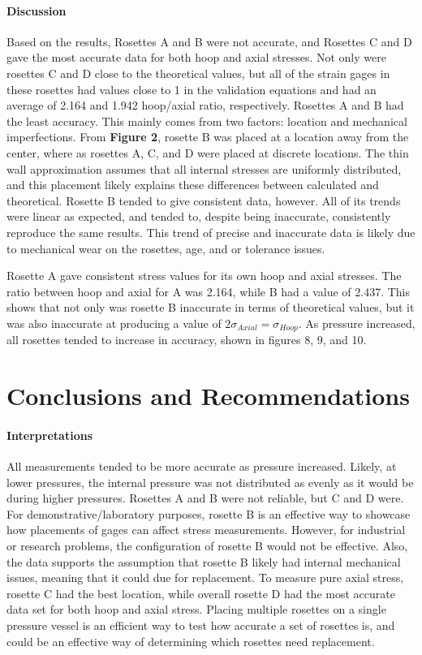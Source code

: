 \documentclass[12pt]{article}
\begin{document}
\paragraph{Discussion}
Based on the results, Rosettes A and B were not accurate, and Rosettes C and D gave the most accurate data for both hoop and axial stresses. Not only were rosettes C and D close to the theoretical values, but all of the strain gages in these rosettes had values close to 1 in the validation equations and had an average of 2.164 and 1.942 hoop/axial ratio, respectively. Rosettes A and B had the least accuracy. This mainly comes from two factors: location and mechanical imperfections. From \textbf{Figure 2}, rosette B was placed at a location away from the center, where as rosettes A, C, and D were placed at discrete locations. The thin wall approximation assumes that all internal stresses are uniformly distributed, and this placement likely explains these differences between calculated and theoretical. Rosette B tended to give consistent data, however. All of its trends were linear as expected, and tended to, despite being inaccurate, consistently reproduce the same results. This trend of precise and inaccurate data is likely due to mechanical wear on the rosettes, age, and or tolerance issues. 

Rosette A gave consistent stress values for its own hoop and axial stresses. The ratio between hoop and axial for A was 2.164, while B had a value of 2.437. This shows that not only was rosette B inaccurate in terms of theoretical values, but it was also inaccurate at producing a value of $2\sigma_{Axial} = \sigma_{Hoop} $. As pressure increased, all rosettes tended to increase in accuracy, shown in figures 8, 9, and 10. 

\section {Conclusions and Recommendations}
\paragraph {Interpretations} 
All measurements tended to be more accurate as pressure increased. Likely, at lower pressures, the internal pressure was not distributed as evenly as it would be during higher pressures. Rosettes A and B were not reliable, but C and D were. For demonstrative/laboratory purposes, rosette B is an effective way to showcase how placements of gages can affect stress measurements. However, for industrial or research problems, the configuration of rosette B would not be effective. Also, the data supports the assumption that rosette B likely had internal mechanical issues, meaning that it could due for replacement. To measure pure axial stress, rosette C had the best location, while overall rosette D had the most accurate data set for both hoop and axial stress. Placing multiple rosettes on a single pressure vessel is an efficient way to test how accurate a set of rosettes is, and could be an effective way of determining which rosettes need replacement.
\end{document}

